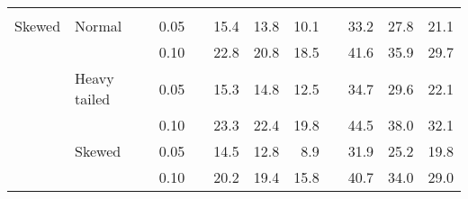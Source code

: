 \begin{table}[ht]
\begin{scriptsize}
\begin{center}
\begin{tabular}{ll p{.1cm} c p{.1cm} rrr p{.1cm} rrr}
&&&&&&&&&&&\\
Skewed       & Normal       && 0.05 &&   15.4 & 13.8 & 10.1 &   & 33.2 & 27.8 & 21.1 \\ 
             &              && 0.10 &&   22.8 & 20.8 & 18.5 &   & 41.6 & 35.9 & 29.7 \\ 
             & Heavy tailed && 0.05 &&   15.3 & 14.8 & 12.5 &   & 34.7 & 29.6 & 22.1 \\ 
             &              && 0.10 &&   23.3 & 22.4 & 19.8 &   & 44.5 & 38.0 & 32.1 \\ 
             & Skewed       && 0.05 &&   14.5 & 12.8 & 8.9 &   & 31.9 & 25.2 & 19.8 \\ 
             &              && 0.10 &&   20.2 & 19.4 & 15.8 &   & 40.7 & 34.0 & 29.0 \\ 



\end{tabular}
\end{center}
\end{scriptsize}
\end{table}
